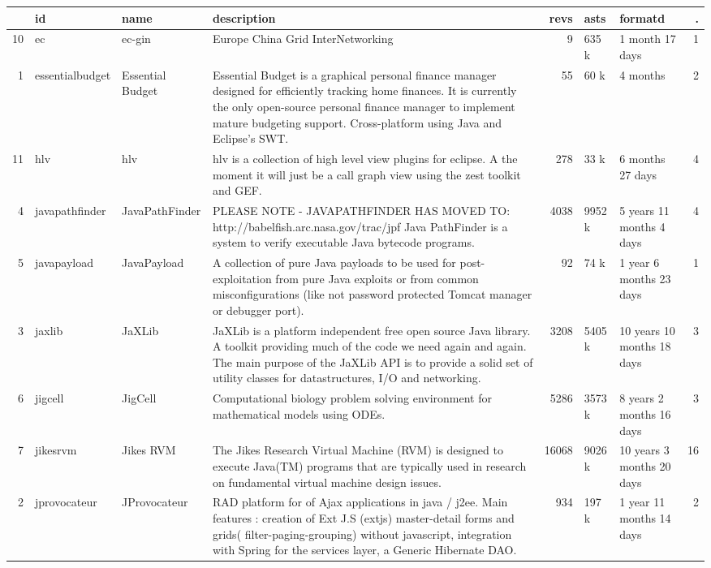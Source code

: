\begin{table}[ht]
\centering
\begin{tabular}{rlllrllr}
  \hline
 & id & name & description & revs & asts & formatd & . \\ 
  \hline
10 & ec & ec-gin & Europe China Grid InterNetworking &   9 & 635 k &  1 month 17 days &   1 \\ 
  1 & essentialbudget & Essential Budget & Essential Budget is a graphical personal finance manager designed for efficiently tracking home finances.  It is currently the only open-source personal finance manager to implement mature budgeting support.  Cross-platform using Java and Eclipse's SWT. &  55 & 60 k &  4 months &   2 \\ 
  11 & hlv & hlv & hlv is a collection of high level view plugins for eclipse. A the moment it will just be a call graph view using the zest toolkit and GEF. & 278 & 33 k &  6 months 27 days &   4 \\ 
  4 & javapathfinder & JavaPathFinder & PLEASE NOTE - JAVAPATHFINDER HAS MOVED TO: http://babelfish.arc.nasa.gov/trac/jpf Java PathFinder is a system to verify executable Java bytecode programs.  & 4038 & 9952 k & 5 years 11 months 4 days &   4 \\ 
  5 & javapayload & JavaPayload & A collection of pure Java payloads to be used for post-exploitation from pure Java exploits or from common misconfigurations (like not password protected Tomcat manager or debugger port). &  92 & 74 k &  1 year 6 months 23 days &   1 \\ 
  3 & jaxlib & JaXLib & JaXLib is a platform independent free open source Java library. A toolkit providing much of the code we need again and again. The main purpose of the JaXLib API is to provide a solid set of utility classes for datastructures, I/O and networking. & 3208 & 5405 k & 10 years 10 months 18 days &   3 \\ 
  6 & jigcell & JigCell & Computational biology problem solving environment for mathematical models using ODEs. & 5286 & 3573 k & 8 years 2 months 16 days &   3 \\ 
  7 & jikesrvm & Jikes RVM & The Jikes Research Virtual Machine (RVM) is designed to execute Java(TM) programs that are typically used in research on fundamental virtual machine design issues. & 16068 & 9026 k & 10 years 3 months 20 days &  16 \\ 
  2 & jprovocateur & JProvocateur & RAD platform for of Ajax applications in java / j2ee. Main features : creation of Ext J.S (extjs) master-detail forms and grids( filter-paging-grouping) without javascript, integration with Spring for the services layer, a Generic Hibernate DAO. & 934 & 197 k &  1 year 11 months 14 days &   2 \\ 

\end{tabular}
\end{table}
